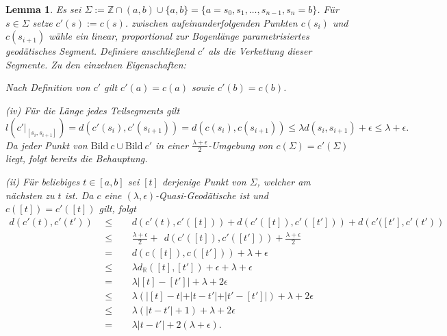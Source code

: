 \documentclass[11pt]{book}
\numberwithin{dummy}{section}
\newtheorem{lemma}[theorem]{Lemma}
\theoremstyle{nonumberbreak}
\newenvironment{pr}[1][]{\ifthenelse{\equal{#1}{}}{\proof}{\proof[#1]}\rm}{\endproof}
\newcommand{\Z}{\mathbb{Z}}
\newcommand{\R}{\mathbb{R}}
\begin{document}
\begin{spacing}{1.4}
\begin{lemma}
\begin{pr}
Es sei $\Sigma := \Z \cap (a,b) \cup \{a,b\} =\{a=s_0, s_1, \ldots, s_{n-1}, s_n=b\}$. Für $s \in \Sigma$ setze $c'(s):= c(s)$. zwischen aufeinanderfolgenden Punkten $c(s_i)$ und $c(s_{i+1})$ wähle ein linear, proportional zur Bogenlänge parametrisiertes geodätisches Segment. Definiere anschließend $c'$ als die Verkettung dieser Segmente. Zu den einzelnen Eigenschaften:
\begin{compactenum}
\item Nach Definition von $c'$ gilt $c'(a)= c(a)$ sowie $c'(b) = c(b)$. 
\item[(iv)] Für die Länge jedes Teilsegments gilt
$$l\left( c'\vert_{[s_i, s_{i+1}]}\right) = d \left( c'(s_i), c'(s_{i+1})\right) = d\left( c(s_i), c(s_{i+1})\right) \leqslant \lambda d(s_i, s_{i+1}) + \epsilon \leqslant \lambda + \epsilon.$$
Da jeder Punkt von $\mathrm{Bild} \ c \cup \mathrm{Bild} \ c'$ in einer $\frac{\lambda + \epsilon}{2}$-Umgebung von $c(\Sigma) = c'(\Sigma)$ liegt, folgt bereits die Behauptung.
\item[(ii)] Für beliebiges $t \in [a,b]$ sei $[t]$ derjenige Punkt von $\Sigma$, welcher am nächsten zu $t$ ist. Da $c$ eine $(\lambda, \epsilon)$-Quasi-Geodätische ist und $c([t])= c'([t])$ gilt, folgt
\begin{alignat*}{5}
d\left( c'(t), c'(t')\right) \ \ & \leqslant && \ \ d\left( c'(t), c'([t]) \right) + d\left( c'([t]), c'([t']) \right) + d\left( c'([t'], c'(t')\right) \\
&\leqslant&& \ \ \frac{\lambda + \epsilon}{2} + \ \ d\left( c'([t]), c'([t'])\right) + \frac{\lambda + \epsilon}{2}\\
&=&& \ \ d \left( c([t]), c([t']) \right) + \lambda + \epsilon \\
&\leqslant&& \ \ \lambda d_{\R}([t], [t']) + \epsilon + \lambda + \epsilon \\
&=&& \ \ \lambda \vert [t]-[t']\vert + \lambda + 2 \epsilon \\
&\leqslant&& \ \ \lambda \left( \vert [t]-t \vert + \vert t-t'\vert + \vert t'-[t'] \vert \right) + \lambda + 2\epsilon \\
&\leqslant&& \ \ \lambda\left(  \vert t-t'\vert + 1 \right) + \lambda + 2\epsilon \\
&=&& \ \ \lambda \vert t-t'\vert + 2 (\lambda + \epsilon).
\end{alignat*}


\end{compactenum}
\end{pr}
\end{lemma}
\end{spacing}
\end{document}
